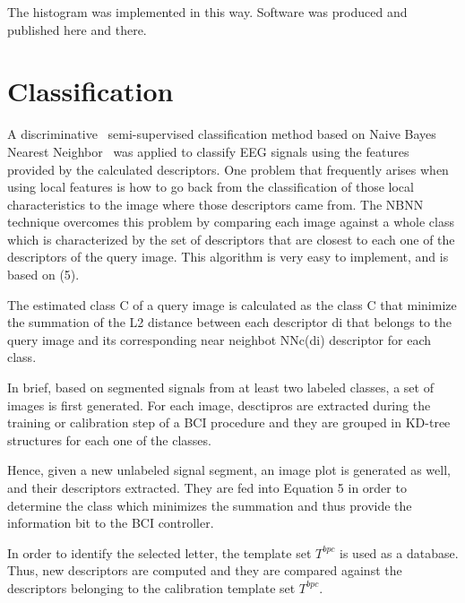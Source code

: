 The histogram was implemented in this way.  Software was produced and published here and there.


\section{Classification}

A discriminative~\cite{WolpawJonathanR2012} semi-supervised classification method based on Naive Bayes Nearest Neighbor~\cite{Boiman2008} was applied to classify EEG signals using the features provided by the calculated descriptors.
One problem that frequently arises when using local features is how to go back from the classification of those local characteristics to the image where those descriptors came from.
The NBNN technique overcomes this problem by comparing each image against a whole class which is characterized by the set of descriptors that are closest to each one of the descriptors of the query image. This algorithm is very easy to implement, and is based on (5).

The estimated class C of a query image is calculated as the class C that minimize the summation of the L2 distance between each descriptor di that belongs to the query image and its corresponding near neighbot NNc(di) descriptor for each class.

In brief, based on segmented signals from at least two labeled classes, a set of images is first generated.  For each image, desctipros are extracted during the training or calibration step of a BCI procedure and they are grouped in KD-tree~\cite{Lowe2004} structures for each one of the classes.

Hence, given a new unlabeled signal segment, an image plot is generated as well, and their descriptors extracted.  They are fed into Equation 5 in order to determine the class which minimizes the summation and thus provide the information bit to the BCI controller.  


In order to identify the selected letter, the template set $T^{bpc}$ is used as a database.  Thus, new descriptors are computed and they are compared against the descriptors belonging to the calibration template set $T^{bpc}$.

